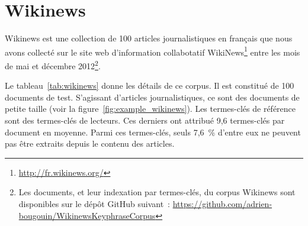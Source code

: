 
  \section[Wikinews]{Wikinews~\textnormal{\large\cite{bougouin2013topicrank}}}
  \label{sec:main-data_description-wikinews_data}
    Wikinews est une collection de 100 articles journalistiques en français
    que nous avons collecté sur le site web d'information collabotatif
    WikiNews\footnote{\url{http://fr.wikinews.org/}} entre les mois de mai et
    décembre 2012\footnote{Les documents, et leur indexation par termes-clés, du corpus Wikinews
    sont disponibles sur le dépôt GitHub suivant~:
    \url{https://github.com/adrien-bougouin/WikinewsKeyphraseCorpus}}.
    
    Le tableau~\ref{tab:wikinews} donne les détails de ce corpus. Il est
    constitué de 100 documents de test. S'agissant d'articles journalistiques,
    ce sont des documents de petite taille (voir la
    figure~\ref{fig:example_wikinews}). Les termes-clés de référence sont des
    termes-clés de lecteurs. Ces derniers ont attribué 9,6 termes-clés par
    document en moyenne. Parmi ces termes-clés, seuls 7,6~\% d'entre eux ne
    peuvent pas être extraits depuis le contenu des articles.

    \begin{table}[!h]
      \centering

      \caption{Corpus Wikinews
               \label{tab:wikinews}}
    \end{table}

